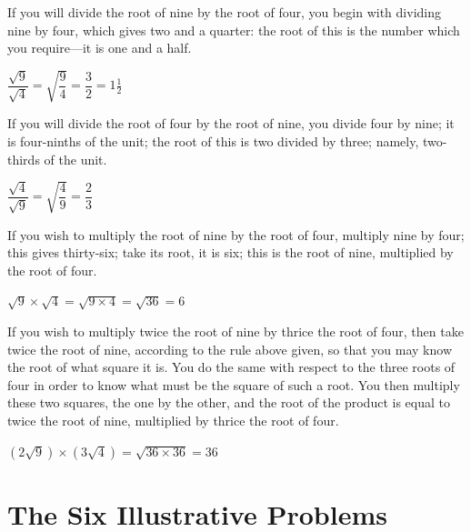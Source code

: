 \documentclass[11pt,a4paper]{book}
\begin{document}
\begin{minipage}[t]{0.48\textwidth}
\raggedright

If you will divide the root of nine by the root of four, you begin with dividing nine by four, which gives two and a quarter: the root of this is the number which you require---it is one and a half.

$\dfrac{\sqrt{9}}{\sqrt{4}} = \sqrt{\dfrac{9}{4}} = \dfrac{3}{2} = 1\tfrac{1}{2}$

\vspace{0.3cm}

If you will divide the root of four by the root of nine, you divide four by nine; it is four-ninths of the unit; the root of this is two divided by three; namely, two-thirds of the unit.

$\dfrac{\sqrt{4}}{\sqrt{9}} = \sqrt{\dfrac{4}{9}} = \dfrac{2}{3}$

\vspace{0.3cm}

If you wish to multiply the root of nine by the root of four, multiply nine by four; this gives thirty-six; take its root, it is six; this is the root of nine, multiplied by the root of four.

$\sqrt{9} \times \sqrt{4} = \sqrt{9 \times 4} = \sqrt{36} = 6$

\vspace{0.3cm}

If you wish to multiply twice the root of nine by thrice the root of four, then take twice the root of nine, according to the rule above given, so that you may know the root of what square it is. You do the same with respect to the three roots of four in order to know what must be the square of such a root. You then multiply these two squares, the one by the other, and the root of the product is equal to twice the root of nine, multiplied by thrice the root of four.

$(2\sqrt{9}) \times (3\sqrt{4}) = \sqrt{36 \times 36} = 36$

\end{minipage}
\vspace{0.3cm}

\newpage

\chapter{The Six Illustrative Problems}
\label{ch:six-problems}
\end{document}
